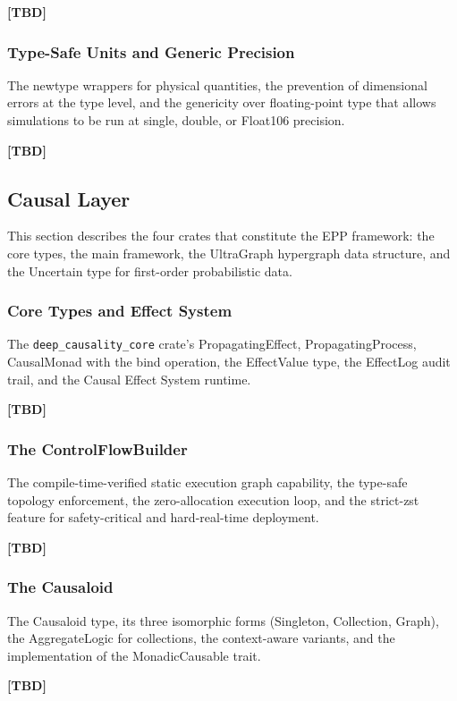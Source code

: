 \textbf{[TBD]}
 
\subsubsection{Type-Safe Units and Generic Precision}
The newtype wrappers for physical quantities, the prevention of dimensional errors at the type level, and the genericity over floating-point type that allows simulations to be run at single, double, or Float106 precision.
 
\textbf{[TBD]}
 
 
\subsection{Causal Layer}
\label{sec:implementation_causal}
 
This section describes the four crates that constitute the EPP framework: the core types, the main framework, the UltraGraph hypergraph data structure, and the Uncertain type for first-order probabilistic data.
 
\subsubsection{Core Types and Effect System}
The \texttt{deep\_causality\_core} crate's PropagatingEffect, PropagatingProcess, CausalMonad with the bind operation, the EffectValue type, the EffectLog audit trail, and the Causal Effect System runtime.
 
\textbf{[TBD]}
 
\subsubsection{The ControlFlowBuilder}
The compile-time-verified static execution graph capability, the type-safe topology enforcement, the zero-allocation execution loop, and the strict-zst feature for safety-critical and hard-real-time deployment.
 
\textbf{[TBD]}
 
\subsubsection{The Causaloid}
The Causaloid type, its three isomorphic forms (Singleton, Collection, Graph), the AggregateLogic for collections, the context-aware variants, and the implementation of the MonadicCausable trait.
 
\textbf{[TBD]}
 
